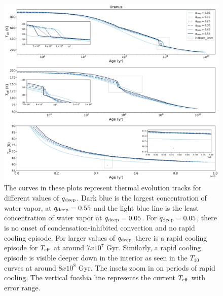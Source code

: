 \documentclass[11pt]{ucscthesisbs}
\begin{document}
\begin{figure}[ht]
 \centerline{
  \includegraphics[scale=0.45]{figures/u_cooling_curves_nz_4096_more_qdeeps.png}
 }
\caption[Thermal Evolution Curves for Uranus - Water Vapor Concentration Comparisons]
{The curves in these plots represent thermal evolution tracks for different values of $q_{\rm deep}$. Dark blue is the largest concentration of water vapor, at $q_{\rm deep} = 0.55$ and the light blue line is the least concentration of water vapor at $q_{\rm deep} = 0.05$. For $q_{\rm deep} = 0.05$, there is no onset of condensation-inhibited convection and no rapid cooling episode. For larger values of $q_{\rm deep}$ there is a rapid cooling episode for $T_{\rm eff}$ at around $7 x 10^7$ Gyr. Similarly, a rapid cooling episode is visible deeper down in the interior as seen in the $T_{10}$ curves at around $8 x 10^8$ Gyr. The insets zoom in on periods of rapid cooling. The vertical fucshia line represents the current $T_{\rm eff}$ with error range.}
\label{fig:evolve_uranus_qdeeps}
\end{figure}

 
\end{document}
